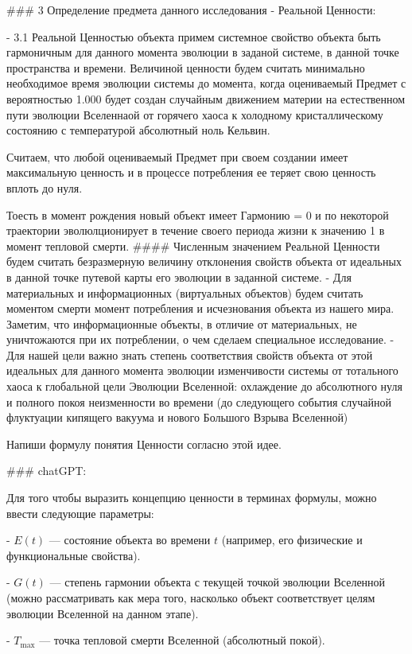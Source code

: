### 3 Определение предмета данного исследования - Реальной Ценности:

- 3.1 Реальной Ценностью объекта примем системное свойство объекта быть гармоничным для данного момента эволюции в заданой системе, в данной точке пространства и времени. 
 Величиной ценности будем считать минимально необходимое время эволюции системы до момента, когда оцениваемый Предмет с вероятностью 1.000 будет создан случайным движением материи на естественном пути эволюции Вселеннаой от горячего хаоса к холодному кристаллическому состоянию с температурой абсолютный ноль Кельвин.
 
 Считаем, что любой оцениваемый Предмет при своем создании имеет максимальную ценность и в процессе потребления ее теряет свою ценность вплоть до нуля. 
 
  Тоесть в момент рождения новый объект имеет  Гармонию = 0 и по некоторой траектории эволюлционирует в течение своего периода жизни к значению 1 в момент тепловой смерти. 
 #### Численным значением Реальной Ценности будем считать безразмерную величину отклонения свойств объекта от идеальных в данной точке путевой карты его эволюции в заданной системе. 
 - Для материальных и информационных (виртуальных объектов) будем считать моментом смерти момент потребления и исчезнования объекта из нашего мира. Заметим, что информационные объекты, в отличие от материальных, не уничтожаются при их потреблении, о чем сделаем специальное исследование. 
 - Для нашей цели важно знать степень соответствия свойств объекта от этой идеальных для данного момента эволюции изменчивости системы от тотального хаоса к глобальной цели Эволюции Вселенной:  охлаждение до абсолютного нуля и полного покоя неизменности во времени (до следующего  события случайной флуктуации кипящего вакуума и нового Большого Взрыва Вселенной)

Напиши формулу  понятия Ценности согласно этой идее.


### chatGPT:


Для того чтобы выразить концепцию ценности в терминах формулы, можно ввести следующие параметры:


- \( E(t) \) — состояние объекта во времени \( t \) (например, его физические и функциональные свойства).

- \( G(t) \) — степень гармонии объекта с текущей точкой эволюции Вселенной (можно рассматривать как мера того, насколько объект соответствует целям эволюции Вселенной на данном этапе).

- \( T_{\text{max}} \) — точка тепловой смерти Вселенной (абсолютный покой).

